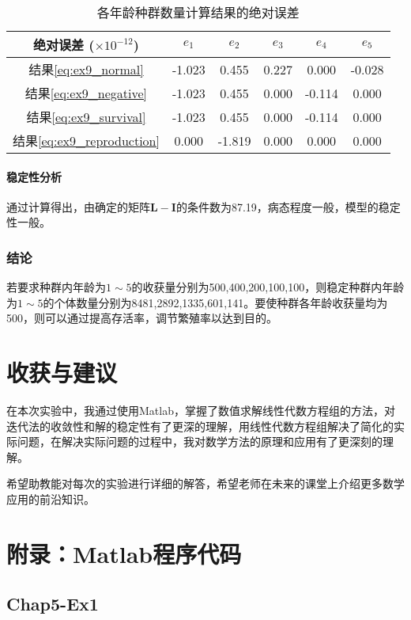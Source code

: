 \documentclass[12pt,a4paper]{article}
\begin{document}
\begin{table}
    \centering
    \caption{各年龄种群数量计算结果的绝对误差}
    \label{tab:ex9_error}
    \begin{tabular}{c|ccccc}
        \toprule
        绝对误差 (\(\times 10^{-12}\)) & \(e_1\) & \(e_2\) &
        \(e_3\) & \(e_4\) & \(e_5\)\tabularnewline
        \midrule
        结果\ref{eq:ex9_normal} & -1.023 & 0.455 & 0.227 & 0.000 & -0.028\tabularnewline
        结果\ref{eq:ex9_negative} & -1.023 & 0.455 & 0.000 & -0.114 & 0.000\tabularnewline
        结果\ref{eq:ex9_survival} & -1.023 & 0.455 & 0.000 & -0.114 & 0.000\tabularnewline
        结果\ref{eq:ex9_reproduction} & 0.000 & -1.819 & 0.000 & 0.000 & 0.000\tabularnewline
        \bottomrule
    \end{tabular}
\end{table}

\paragraph{稳定性分析} 通过计算得出，由确定的矩阵$\boldsymbol{L} - \boldsymbol{I}$的条件数为87.19，病态程度一般，模型的稳定性一般。

\subsubsection{结论}

若要求种群内年龄为$1\sim 5$的收获量分别为500,400,200,100,100，则稳定种群内年龄为$1\sim 5$的个体数量分别为8481,2892,1335,601,141。要使种群各年龄收获量均为500，则可以通过提高存活率，调节繁殖率以达到目的。

\section{收获与建议}

在本次实验中，我通过使用Matlab，掌握了数值求解线性代数方程组的方法，对迭代法的收敛性和解的稳定性有了更深的理解，用线性代数方程组解决了简化的实际问题，在解决实际问题的过程中，我对数学方法的原理和应用有了更深刻的理解。

希望助教能对每次的实验进行详细的解答，希望老师在未来的课堂上介绍更多数学应用的前沿知识。

\section{附录：Matlab程序代码}

\subsection{Chap5-Ex1}\label{sec:ex1_code}
\end{document}
